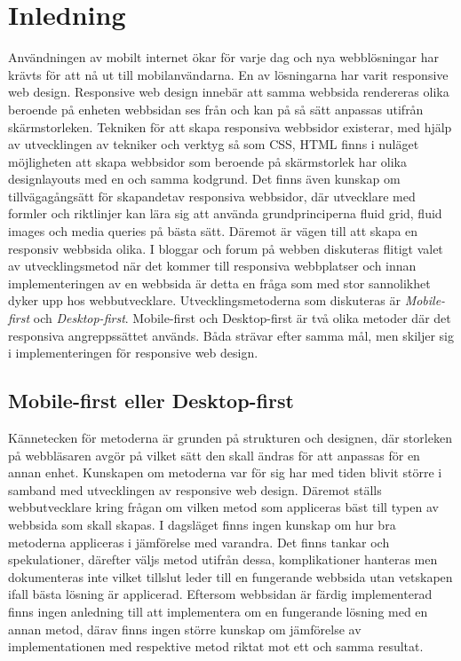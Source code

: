 \documentclass[11pt]{article}
\begin{document}
\section{Inledning}
Användningen av mobilt internet ökar för varje dag och nya webblösningar har krävts för att nå ut till mobilanvändarna. En av lösningarna har varit responsive web design. Responsive web design innebär att samma webbsida rendereras olika beroende på enheten webbsidan ses från och kan på så sätt anpassas utifrån skärmstorleken. Tekniken för att skapa responsiva webbsidor existerar, med hjälp av utvecklingen av tekniker och verktyg så som CSS, HTML finns i nuläget möjligheten att skapa webbsidor som beroende på skärmstorlek har olika designlayouts med en och samma kodgrund. Det finns även kunskap om tillvägagångsätt för skapandetav responsiva webbsidor, där utvecklare med formler och riktlinjer kan lära sig att använda grundprinciperna fluid grid, fluid images och media queries på bästa sätt. Däremot är vägen till att skapa en responsiv webbsida olika.  I bloggar och forum på webben diskuteras flitigt valet av utvecklingsmetod när det kommer till responsiva webbplatser och innan implementeringen av en webbsida är detta en fråga som med stor sannolikhet dyker upp hos webbutvecklare. Utvecklingsmetoderna som diskuteras är \textit{Mobile-first} och \textit{Desktop-first}. Mobile-first och Desktop-first är två olika metoder där det responsiva angreppssättet används. Båda strävar efter samma mål, men skiljer sig i implementeringen för responsive web design.

\subsection{Mobile-first eller Desktop-first}
Kännetecken för metoderna är  grunden på strukturen och designen,  där storleken på webbläsaren avgör på vilket sätt den  skall ändras för att anpassas för en annan enhet. Kunskapen om metoderna var för sig har med tiden blivit större i samband med utvecklingen av responsive web design. Däremot ställs webbutvecklare kring frågan om vilken metod som appliceras bäst till typen av webbsida som skall skapas. I dagsläget finns ingen kunskap om hur bra metoderna appliceras i jämförelse med varandra. Det finns tankar och spekulationer, därefter väljs metod utifrån dessa, komplikationer hanteras men dokumenteras inte vilket tillslut leder till en fungerande webbsida utan vetskapen ifall bästa lösning är applicerad. Eftersom webbsidan är färdig implementerad finns ingen anledning till att implementera om en fungerande lösning med en annan metod, därav finns ingen större kunskap om jämförelse av implementationen med respektive metod riktat mot ett och samma resultat.
\end{document}
